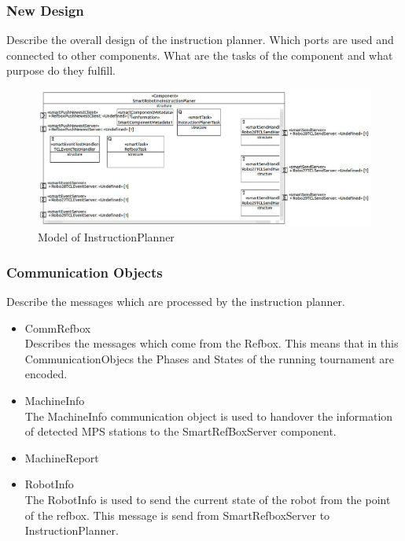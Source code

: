 \subsubsection{New Design}
\label{sec:new_design}
Describe the overall design of the instruction planner. Which ports are used and connected to other components. What are the tasks of the component and what purpose do they fulfill. 

\begin{figure}[h]
\centering
\includegraphics[scale=0.25]{pic/SmartRobotinoInstructionPlaner.JPG}
\caption{Model of InstructionPlanner}
\end{figure}


\subsubsection{Communication Objects}

Describe the messages which are processed by the instruction planner. 

\begin{itemize}

\item CommRefbox \\

Describes the messages which come from the Refbox. This means that in this CommunicationObjecs the 
Phases and States of the running tournament are encoded.

\item MachineInfo \\

The MachineInfo communication object is used to handover the information of detected MPS stations to the SmartRefBoxServer component. 

\item MachineReport \\

\item RobotInfo \\

The RobotInfo is used to send the current state of the robot from the point of the refbox. This message is send from SmartRefboxServer to InstructionPlanner. 

\end{itemize}



